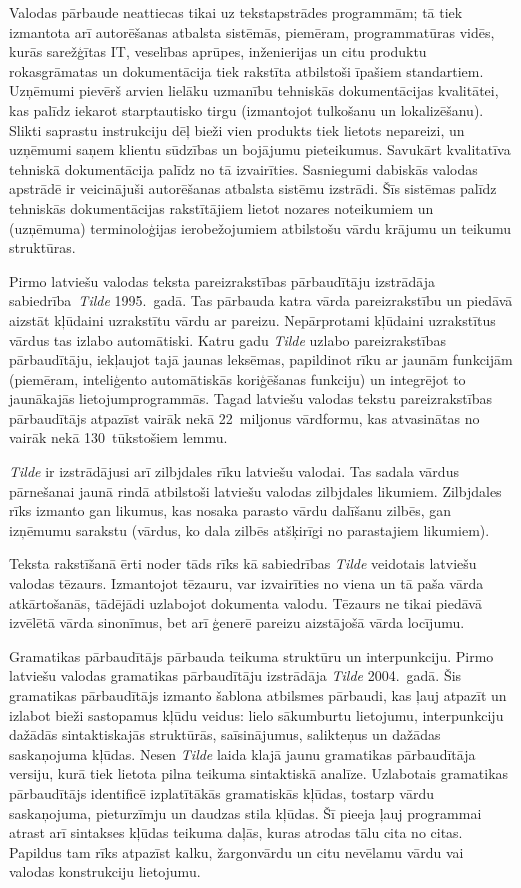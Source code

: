 \begin{multicols}{2}
Valodas pārbaude neattiecas tikai uz tekstapstrādes programmām; tā tiek izmantota arī autorēšanas atbalsta sistēmās, piemēram, programmatūras vidēs, kurās sarežģītas IT, veselības aprūpes, inženierijas un citu produktu rokasgrāmatas un dokumentācija tiek rakstīta atbilstoši īpašiem standartiem. 
Uzņēmumi pievērš arvien lielāku uzmanību tehniskās dokumentācijas kvalitātei, kas palīdz iekarot starptautisko tirgu (izmantojot tulkošanu un lokalizēšanu). 
Slikti saprastu instrukciju dēļ bieži vien produkts tiek lietots nepareizi, un uzņēmumi saņem klientu sūdzības un bojājumu pieteikumus. 
Savukārt kvalitatīva tehniskā dokumentācija palīdz no tā izvairīties. 
Sasniegumi dabiskās valodas apstrādē ir veicinājuši autorēšanas atbalsta sistēmu izstrādi. 
Šīs sistēmas palīdz tehniskās dokumentācijas rakstītājiem lietot nozares noteikumiem un (uzņēmuma) terminoloģijas ierobežojumiem atbilstošu vārdu krājumu un teikumu struktūras.

Pirmo latviešu valodas teksta pareizrakstības pārbaudītāju izstrādāja sabiedrība~\textit{Tilde} 1995.~gadā.
Tas pārbauda katra vārda pareizrakstību un piedāvā aizstāt kļūdaini uzrakstītu vārdu ar pareizu.
Nepārprotami kļūdaini uzrakstītus vārdus tas izlabo automātiski.
Katru gadu \textit{Tilde} uzlabo pareizrakstības pārbaudītāju, iekļaujot tajā jaunas leksēmas, papildinot rīku ar jaunām funkcijām (piemēram, inteliģento automātiskās koriģēšanas funkciju) un integrējot to jaunākajās lietojumprogrammās.
Tagad latviešu valodas tekstu pareizrakstības pārbaudītājs atpazīst vairāk nekā 22~miljonus vārdformu, kas atvasinātas no vairāk nekā 130~tūkstošiem lemmu.

\textit{Tilde} ir izstrādājusi arī zilbjdales rīku latviešu valodai.
Tas sadala vārdus pārnešanai jaunā rindā atbilstoši latviešu valodas zilbjdales likumiem.
Zilbjdales rīks izmanto gan likumus, kas nosaka parasto vārdu dalīšanu zilbēs, gan izņēmumu sarakstu (vārdus, ko dala zilbēs atšķirīgi no parastajiem likumiem). 

Teksta rakstīšanā ērti noder tāds rīks kā sabiedrības \textit{Tilde} veidotais latviešu valodas tēzaurs.
Izmantojot tēzauru, var izvairīties no viena un tā paša vārda atkārtošanās, tādējādi uzlabojot dokumenta valodu.
Tēzaurs ne tikai piedāvā izvēlētā vārda sinonīmus, bet arī ģenerē pareizu aizstājošā vārda locījumu. 

Gramatikas pārbaudītājs pārbauda teikuma struktūru un interpunkciju.
Pirmo latviešu valodas gramatikas pārbaudītāju izstrādāja \textit{Tilde }2004.~gadā.
Šis gramatikas pārbaudītājs izmanto šablona atbilsmes pārbaudi, kas ļauj atpazīt un izlabot bieži sastopamus kļūdu veidus: lielo sākumburtu lietojumu, interpunkciju dažādās sintaktiskajās struktūrās, saīsinājumus, salikteņus un dažādas saskaņojuma kļūdas.
Nesen \textit{Tilde} laida klajā jaunu gramatikas pārbaudītāja versiju, kurā tiek lietota pilna teikuma sintaktiskā analīze.
Uzlabotais gramatikas pārbaudītājs identificē izplatītākās gramatiskās kļūdas, tostarp vārdu saskaņojuma, pieturzīmju un daudzas stila kļūdas.
Šī pieeja ļauj programmai atrast arī sintakses kļūdas teikuma daļās, kuras atrodas tālu cita no citas.
Papildus tam rīks atpazīst kalku, žargonvārdu un citu nevēlamu vārdu vai valodas konstrukciju lietojumu.


\end{multicols}
